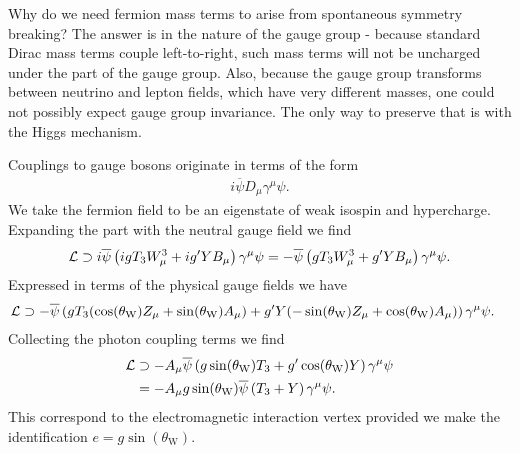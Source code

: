 Why do we need fermion mass terms to arise from spontaneous symmetry breaking? The answer is in the nature of the gauge group - because standard Dirac mass terms couple left-to-right, such mass terms will not be uncharged under the  part of the gauge group. Also, because the gauge group transforms between neutrino and lepton fields, which have very different masses, one could not possibly expect gauge group invariance. The only way to preserve that is with the Higgs mechanism.

Couplings to gauge bosons originate in terms of the form
\begin{align*}
	i\overline{\psi}D_{\mu}\gamma^{\mu}\psi.
\end{align*}
We take the fermion field to be an eigenstate of weak isospin and hypercharge. Expanding the part with the neutral gauge field we find
\begin{align*}
	\mathcal{L} \supset i\overline{\psi}\left(igT_{3}W_{\mu}^{3} + ig^{\prime} YB_{\mu}\right)\gamma^{\mu}\psi = -\overline{\psi}\left(gT_{3}W_{\mu}^{3} + g^{\prime} YB_{\mu}\right)\gamma^{\mu}\psi.
\end{align*}
Expressed in terms of the physical gauge fields we have
\begin{align*}
	\mathcal{L} &\supset -\overline{\psi}\left(gT_{3}(\cos(\theta_{\text{W}})Z_{\mu} + \sin(\theta_{\text{W}})A_{\mu}) + g^{\prime} Y(-\sin(\theta_{\text{W}})Z_{\mu} + \cos(\theta_{\text{W}})A_{\mu})\right)\gamma^{\mu}\psi.
\end{align*}
Collecting the photon coupling terms we find
\begin{align*}
	\mathcal{L} &\supset -A_{\mu}\overline{\psi}\left(g\sin(\theta_{\text{W}})T_{3} + g^{\prime} \cos(\theta_{\text{W}})Y\right)\gamma^{\mu}\psi \\
	     &= -A_{\mu}g\sin(\theta_{\text{W}})\overline{\psi}\left(T_{3} + Y\right)\gamma^{\mu}\psi.
\end{align*}
This correspond to the electromagnetic interaction vertex provided we make the identification $e = g\sin(\theta_{\text{W}})$.

